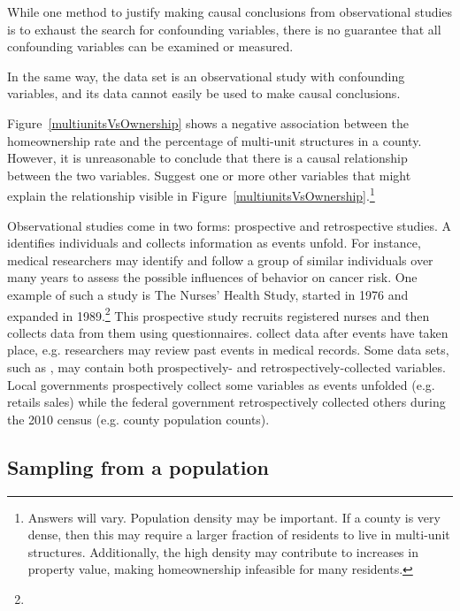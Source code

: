 While one method to justify making causal conclusions from observational studies is to exhaust the search for confounding variables, there is no guarantee that all confounding variables can be examined or measured.

In the same way, the  data set is an observational study with confounding variables, and its data cannot easily be used to make causal conclusions.

\begin{exercise}
Figure~\ref{multiunitsVsOwnership} shows a negative association between the homeownership rate and the percentage of multi-unit structures in a county. However, it is unreasonable to conclude that there is a causal relationship between the two variables. Suggest one or more other variables that might explain the relationship visible in Figure~\ref{multiunitsVsOwnership}.\footnote{Answers will vary. Population density may be important. If a county is very dense, then this may require a larger fraction of residents to live in multi-unit structures. Additionally, the high density may contribute to increases in property value, making homeownership infeasible for many residents.}
\end{exercise}

Observational studies come in two forms: prospective and retrospective studies. A  identifies individuals and collects information as events unfold. For instance, medical researchers may identify and follow a group of similar individuals over many years to assess the possible influences of behavior on cancer risk. One example of such a study is The Nurses’ Health Study, started in 1976 and expanded in 1989.\footnote{} This prospective study recruits registered nurses and then collects data from them using questionnaires.  collect data after events have taken place, e.g. researchers may review past events in medical records. Some data sets, such as , may contain both prospectively- and retrospectively-collected variables. Local governments prospectively collect some variables as events unfolded (e.g. retails sales) while the federal government retrospectively collected others during the 2010 census (e.g. county population counts).


\subsection{Sampling from a population}

